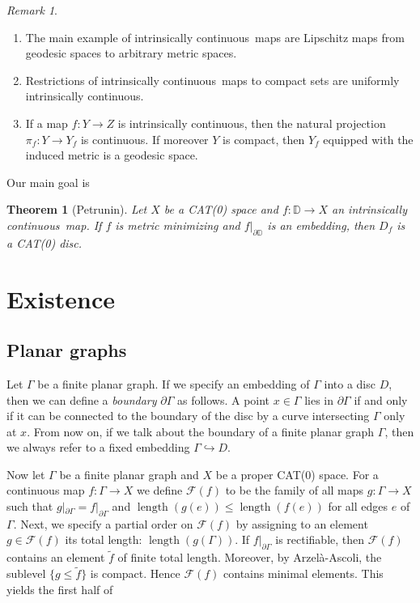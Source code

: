 \documentclass[a4paper,12pt]{article}
\newtheorem{theorem}{Theorem}
\theoremstyle{remark}\newtheorem*{remark}{Remark}
\theoremstyle{definition}\newtheorem{definition}{Definition}
\newcommand{\DD}{\mathbb D}
\newcommand{\len}{\operatorname{length}}
\newcommand{\ic}{intrinsically continuous}
\begin{document}
\begin{remark}
\begin{enumerate}
 \item The main example of \ic\ maps are Lipschitz
maps from geodesic spaces to arbitrary metric spaces.
\item Restrictions of \ic\ maps to compact sets are uniformly \ic. 
\item If a map $f:Y\to Z$ is \ic, then 
the natural projection $\pi_f:Y\rightarrow Y_f$ is continuous. If
moreover $Y$ is compact, then $Y_f$ equipped with the induced 
metric is a geodesic space.
\end{enumerate}
\end{remark}

Our main goal is 

\begin{theorem}[Petrunin]
Let $X$ be a CAT(0) space and $f:\DD\rightarrow X$ an \ic\ map. If $f$ is metric minimizing and 
$f|_{\partial \DD}$ is an embedding, then $D_f$ is a CAT(0) disc.
\end{theorem}

\section{Existence}

\subsection{Planar graphs}
Let $\Gamma$ be a finite planar graph. If we specify an embedding of $\Gamma$ into a disc $D$, then 
we can define a {\em boundary} $\partial \Gamma$ as follows. A point $x\in\Gamma$ 
lies in $\partial\Gamma$ if and only if it can be connected to the 
boundary of the disc by a curve intersecting $\Gamma$ only at $x$. 
From now on, if we talk about the boundary of a finite planar graph $\Gamma$, then we
always refer to a fixed embedding $\Gamma\hookrightarrow D$.

Now let $\Gamma$ be a finite planar graph and $X$ be a proper CAT(0) space. 
For a continuous map $f:\Gamma\rightarrow X$ we define
$\mathcal{F}(f)$ to be the family of all maps $g:\Gamma\rightarrow X$ such that 
$g|_{\partial\Gamma}=f|_{\partial\Gamma}$ and
$\len(g(e))\leq\len(f(e))$ for all edges $e$ of $\Gamma$. Next, we specify a partial
order on  $\mathcal{F}(f)$ by assigning to an element $g\in \mathcal{F}(f)$ its total
length: $\len(g(\Gamma))$. If $f|_{\partial\Gamma}$ is rectifiable, then $\mathcal{F}(f)$
contains an element $\tilde f$ of finite total length. Moreover, by Arzel\`a-Ascoli, 
the sublevel $\{g\leq \tilde f\}$ is compact. Hence $\mathcal{F}(f)$ contains minimal 
elements. This yields the first half of
\end{document}
